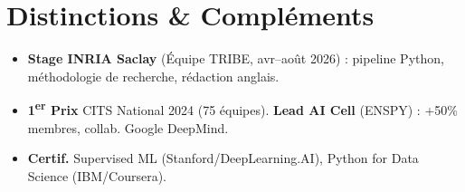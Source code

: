 \documentclass[a4paper,11pt]{article}
\begin{document}
\section{Distinctions \& Compléments}
\begin{itemize}[leftmargin=*, label=\tiny$\bullet$, nosep]
    \item \small{\textbf{Stage INRIA Saclay} (Équipe TRIBE, avr--août 2026) : pipeline Python, méthodologie de recherche, rédaction anglais.}
    \item \small{\textbf{1\textsuperscript{er} Prix} CITS National 2024 (75 équipes). \textbf{Lead AI Cell} (ENSPY) : +50\% membres, collab. Google DeepMind.}
    \item \small{\textbf{Certif.} Supervised ML (Stanford/DeepLearning.AI), Python for Data Science (IBM/Coursera).}
\end{itemize}
\end{document}
